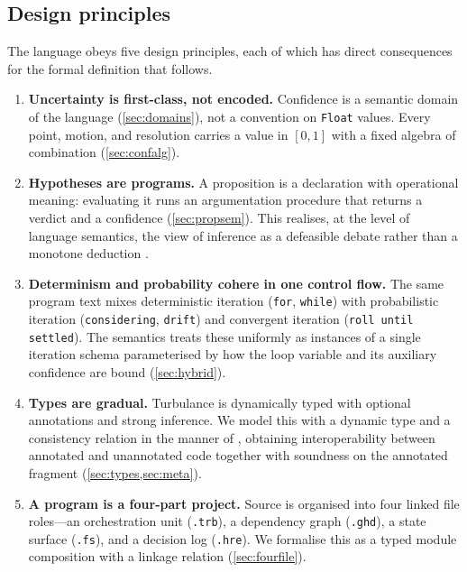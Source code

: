 \documentclass[11pt,a4paper]{article}
\theoremstyle{plain}
\theoremstyle{definition}
\theoremstyle{remark}
\newcommand{\Unit}{[0,1]}
\begin{document}
\subsection{Design principles}
\label{sec:principles}

The language obeys five design principles, each of which has direct
consequences for the formal definition that follows.

\begin{enumerate}[leftmargin=1.4em]
\item \textbf{Uncertainty is first-class, not encoded.} Confidence is a
semantic domain of the language (\cref{sec:domains}), not a convention on
\texttt{Float} values. Every point, motion, and resolution carries a value in
$\Unit$ with a fixed algebra of combination (\cref{sec:confalg}).

\item \textbf{Hypotheses are programs.} A proposition is a declaration with
operational meaning: evaluating it runs an argumentation procedure that returns
a verdict and a confidence (\cref{sec:propsem}). This realises, at the level of
language semantics, the view of inference as a defeasible debate rather than a
monotone deduction \citep{dung1995,besnard2008}.

\item \textbf{Determinism and probability cohere in one control flow.} The same
program text mixes deterministic iteration (\texttt{for}, \texttt{while}) with
probabilistic iteration (\texttt{considering}, \texttt{drift}) and convergent
iteration (\texttt{roll until settled}). The semantics treats these uniformly
as instances of a single iteration schema parameterised by how the loop
variable and its auxiliary confidence are bound (\cref{sec:hybrid}).

\item \textbf{Types are gradual.} Turbulance is dynamically typed with optional
annotations and strong inference. We model this with a dynamic type and a
consistency relation in the manner of \citet{siek2006}, obtaining
interoperability between annotated and unannotated code together with soundness
on the annotated fragment (\cref{sec:types,sec:meta}).

\item \textbf{A program is a four-part project.} Source is organised into four
linked file roles---an orchestration unit (\texttt{.trb}), a dependency graph
(\texttt{.ghd}), a state surface (\texttt{.fs}), and a decision log
(\texttt{.hre}). We formalise this as a typed module composition with a
linkage relation (\cref{sec:fourfile}).
\end{enumerate}
\end{document}
